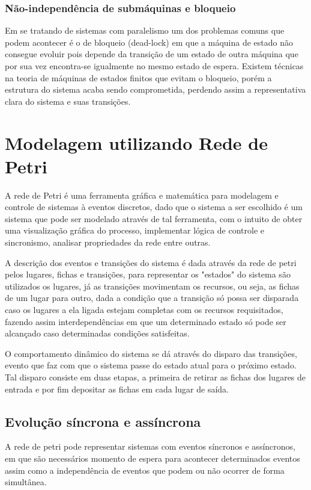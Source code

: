 \subsubsection{Não-independência de submáquinas e bloqueio}
Em se tratando de sistemas com paralelismo um dos problemas comuns que podem acontecer é o de bloqueio (dead-lock) em que a máquina de estado não consegue evoluir pois depende da transição de um estado de outra máquina que por sua vez encontra-se igualmente no mesmo estado de espera. Existem técnicas na teoria de máquinas de estados finitos que evitam o bloqueio, porém a estrutura do sistema acaba sendo comprometida, perdendo assim a representativa clara do sistema e suas transições.

\section{Modelagem utilizando Rede de Petri}

A rede de Petri é uma ferramenta gráfica e matemática para modelagem e controle de sistemas à eventos discretos, dado que o sistema a ser escolhido é um sistema que pode ser modelado através de tal ferramenta, com o intuito de obter uma visualização gráfica do processo, implementar lógica de controle e sincronismo, analisar propriedades da rede entre outras.

A descrição dos eventos e transições do sistema é dada através da rede de petri pelos lugares, fichas e transições, para representar os "estados" do sistema são utilizados os lugares, já as transições movimentam os recursos, ou seja, as fichas de um lugar para outro, dada a condição que a transição só possa ser disparada caso os lugares a ela ligada estejam completas com os recursos requisitados, fazendo assim interdependências em que um determinado estado só pode ser alcançado caso determinadas condições satisfeitas.

O comportamento dinâmico do sistema se dá através do disparo das transições, evento que faz com que o sistema passe do estado atual para o próximo estado. Tal disparo consiste em duas etapas, a primeira de retirar as fichas dos lugares de entrada e por fim depositar as fichas em cada lugar de saída.

\subsection{Evolução síncrona e assíncrona}
A rede de petri pode representar sistemas com eventos síncronos e assíncronos, em que são necessários momento de espera para acontecer determinados eventos assim como a independência de eventos que podem ou não ocorrer de forma simultânea.

